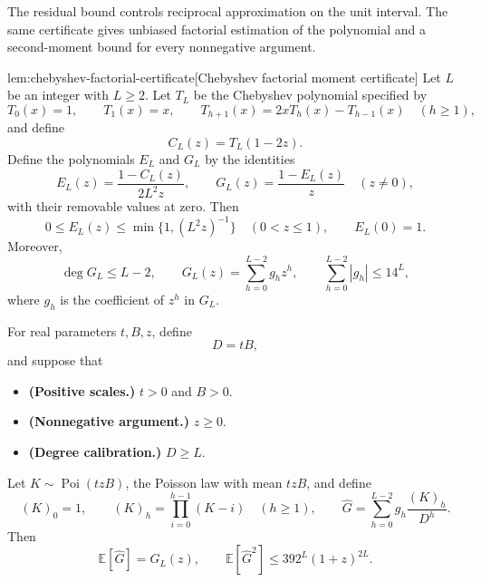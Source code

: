 \documentclass[11pt]{article}
\begin{document}
The residual bound controls reciprocal approximation on the unit interval. The same certificate gives unbiased factorial estimation of the polynomial and a second-moment bound for every nonnegative argument.

\begin{lemmav}{lem:chebyshev-factorial-certificate}[Chebyshev factorial moment certificate]
Let \(L\) be an integer with \(L\ge2\). Let \(T_L\) be the Chebyshev polynomial specified by
\[
T_0(x)=1,\qquad T_1(x)=x,\qquad
T_{h+1}(x)=2xT_h(x)-T_{h-1}(x)\quad(h\ge1),
\]
and define
\[
C_L(z)=T_L(1-2z).
\]
Define the polynomials \(E_L\) and \(G_L\) by the identities
\[
E_L(z)=\frac{1-C_L(z)}{2L^2z},
\qquad
G_L(z)=\frac{1-E_L(z)}{z}
\quad(z\ne0),
\]
with their removable values at zero. Then
\[
0\le E_L(z)\le\min\{1,(L^2z)^{-1}\}
\quad(0<z\le1),
\qquad E_L(0)=1.
\]
Moreover,
\[
\deg G_L\le L-2,\qquad
G_L(z)=\sum_{h=0}^{L-2}g_hz^h,\qquad
\sum_{h=0}^{L-2}|g_h|\le14^L,
\]
where \(g_h\) is the coefficient of \(z^h\) in \(G_L\).

For real parameters \(t,B,z\), define
\[
D=tB,
\]
and suppose that
\begin{itemize}
\item \textbf{(Positive scales.)} \(t>0\) and \(B>0\).
\item \textbf{(Nonnegative argument.)} \(z\ge0\).
\item \textbf{(Degree calibration.)} \(D\ge L\).
\end{itemize}
Let \(K\sim\operatorname{Poi}(tzB)\), the Poisson law with mean \(tzB\), and define
\[
(K)_0=1,\qquad
(K)_h=\prod_{i=0}^{h-1}(K-i)\quad(h\ge1),
\qquad
\widehat G=\sum_{h=0}^{L-2}g_h\frac{(K)_h}{D^h}.
\]
Then
\[
\mathbb E[\widehat G]=G_L(z),
\qquad
\mathbb E[\widehat G^2]\le392^L(1+z)^{2L}.
\]
\end{lemmav}
\end{document}

